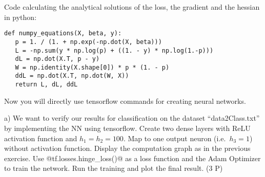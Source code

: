 Code calculating the analytical solutions of the loss, the gradient and the hessian in python:
\begin{code}%
\begin{verbatim}
def numpy_equations(X, beta, y):
   p = 1. / (1. + np.exp(-np.dot(X, beta)))
   L = -np.sum(y * np.log(p) + ((1. - y) * np.log(1.-p)))
   dL = np.dot(X.T, p - y)
   W = np.identity(X.shape[0]) * p * (1. - p)
   ddL = np.dot(X.T, np.dot(W, X))
   return L, dL, ddL
\end{verbatim}
\end{code}






Now you will directly use tensorflow commands for creating neural
networks.

a) We want to verify our results for classification on the dataset
``data2Class.txt'' by implementing the NN using tensorflow. Create two
dense layers with ReLU activation function and $h_1 = h_2 = 100$. Map
to one output neuron (i.e.\ $h_3 = 1$) without activation
function. Display the computation graph as in the previous
exercise. Use @tf.losses.hinge_loss()@ as a loss function and the Adam
Optimizer to train the network. Run the training and plot the final
result. (3 P)

